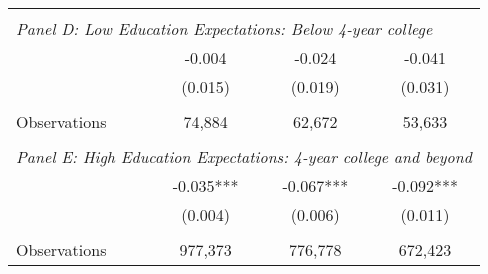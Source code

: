 {\begin{tabular}{lccc}
&  &  &   \\
\multicolumn{4}{l}{\textit{Panel D: Low Education Expectations: Below 4-year college}} \\
\hspace{3mm}        &      -0.004   &      -0.024   &      -0.041   \\
                    &     (0.015)   &     (0.019)   &     (0.031)   \\
                    &               &               &               \\
\hspace{3mm}Observations&      74,884   &      62,672   &      53,633   \\
 
&  &  &   \\
\multicolumn{4}{l}{\textit{Panel E: High Education Expectations: 4-year college and beyond}} \\
\hspace{3mm}        &      -0.035***&      -0.067***&      -0.092***\\
                    &     (0.004)   &     (0.006)   &     (0.011)   \\
                    &               &               &               \\
\hspace{3mm}Observations&     977,373   &     776,778   &     672,423   \\
 

\bottomrule
\end{tabular}
}
